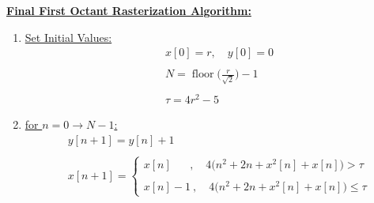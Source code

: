 \documentclass{article}
\DeclareMathOperator{\floor}{floor}
\begin{document}
\underline{\textbf{Final First Octant Rasterization Algorithm:}} \\
\begin{enumerate}
    \item \underline{Set Initial Values:} 
          \begin{align*}
                &x[0] = r, \quad y[0] = 0 \\ \\
                &N = \floor\Bigg(\frac{r}{\sqrt{2}}\Bigg) - 1 \\ \\
                &\tau = 4r^{2} - 5
            \end{align*}
    \item \underline{for $n = 0 \rightarrow N - 1$:} \\
          \begin{align*}
            &y[n + 1] = y[n] + 1 \\ \\
            &x[n + 1] = \begin{cases}
                            x[n] \quad \ \ \ , \quad 4\Big(n^{2} + 2n + x^{2}[n] + x[n]\Big) > \tau \\ \\
                            x[n] - 1 \ , \quad 4\Big(n^{2} + 2n + x^{2}[n] + x[n]\Big) \leq \tau
                          \end{cases}
      \end{align*}
\end{enumerate}
\end{document}
